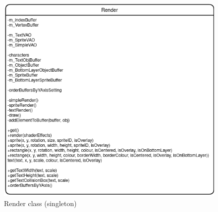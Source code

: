 \documentclass[../../Main.tex]{subfiles}
\begin{document}
    \begin{figure}[hbt!]
        \centerline{\includegraphics[scale=0.5]{img/Classes/Render.png}}
        \caption{Render class (singleton)}
        \label{fig}
    \end{figure}
\end{document}
